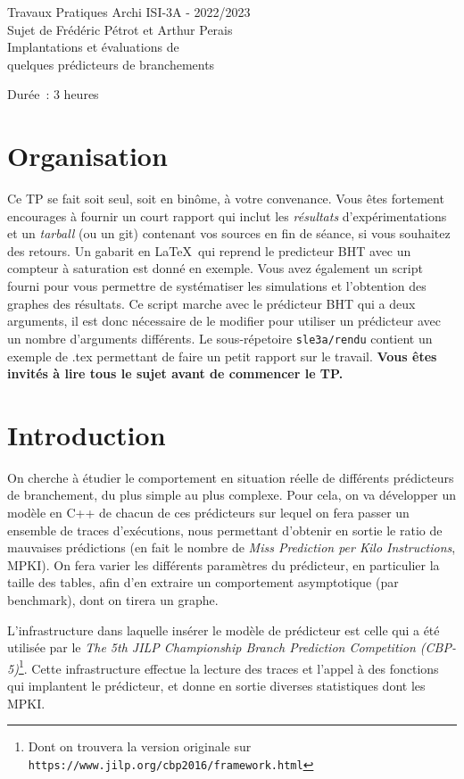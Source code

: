 \documentclass[a4paper]{article}
\begin{document}
\begin{center}
\large
Travaux Pratiques Archi ISI-3A - 2022/2023\\
Sujet de Frédéric Pétrot et Arthur Perais\\
\LARGE
Implantations et évaluations de\\
quelques prédicteurs de branchements\\
\large

Durée~: 3 heures
\end{center}
\section{Organisation}
Ce TP se fait soit seul, soit en binôme, à votre convenance.
Vous êtes fortement encourages à fournir un court rapport qui inclut les \emph{résultats} d'expérimentations et un \emph{tarball} (ou un git) contenant vos sources en fin de séance, si vous souhaitez des retours.
Un gabarit en \LaTeX\ qui reprend le predicteur BHT avec un compteur à saturation est donné en exemple.
Vous avez également un script fourni pour vous permettre de systématiser les simulations et l'obtention des graphes des résultats.
Ce script marche avec le prédicteur BHT qui a deux arguments, il est donc nécessaire de le modifier pour utiliser un prédicteur avec un nombre d'arguments différents.
Le sous-répetoire \verb+sle3a/rendu+ contient un exemple de .tex permettant de faire un petit rapport sur le travail. \textbf{Vous êtes invités à lire tous le sujet avant de commencer le TP.}

\section{Introduction}
On cherche à étudier le comportement en situation réelle de différents prédicteurs de branchement, du plus simple au plus complexe. Pour cela, on va développer un modèle en C++ de chacun de ces prédicteurs sur lequel on fera passer un ensemble de traces d'exécutions, nous permettant d'obtenir en sortie le ratio de mauvaises prédictions (en fait le nombre de \emph{Miss Prediction per Kilo Instructions}, MPKI). On fera varier les différents paramètres du prédicteur, en particulier la taille des tables, afin d'en extraire un comportement asymptotique (par benchmark), dont on tirera un graphe.

L'infrastructure dans laquelle insérer le modèle de prédicteur est celle qui a été utilisée par le \emph{The 5th JILP Championship Branch Prediction Competition (CBP-5)}\footnote{Dont on trouvera la version originale sur \texttt{https://www.jilp.org/cbp2016/framework.html}}.
Cette infrastructure effectue la lecture des traces et l'appel à des fonctions qui implantent le prédicteur, et donne en sortie diverses statistiques dont les MPKI.
\end{document}
